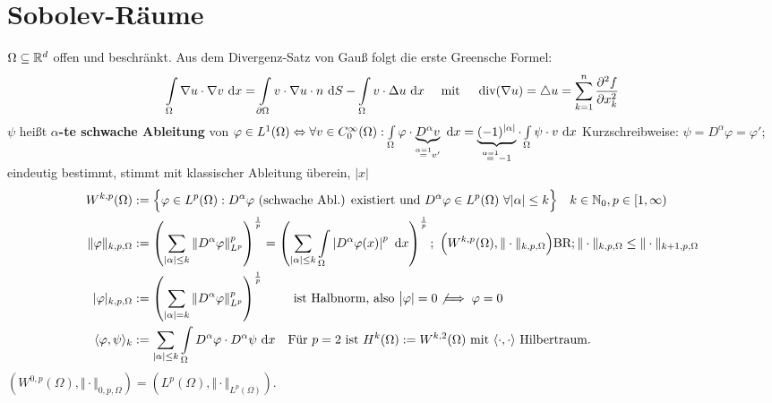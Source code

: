 \documentclass[12pt]{scrartcl}
\begin{document}
	\section{Sobolev-Räume}
	
	$\Omega\subseteq\mathbb{R}^d$ offen und beschränkt.
	Aus dem Divergenz-Satz von Gauß folgt die erste Greensche Formel:
	\begin{align}\label{eqGreen}
		\int\limits_\Omega\nabla u\cdot\nabla v\text{ d} x
		=\int\limits_{\partial\Omega}v\cdot\nabla u\cdot n\text{ d} S-\int\limits_\Omega v\cdot\Delta u\text{ d} x\quad\text{ mit }\quad
		\operatorname{div}(\nabla u)=\triangle u=\sum\limits_{k=1}^n\frac{\partial^2 f}{\partial x_k^2}
	\end{align}
	$\psi$ heißt \textbf{$\alpha$-te schwache Ableitung} von $\varphi\in L^1(\Omega)\Leftrightarrow
		\forall v\in C_0^\infty(\Omega):\int\limits_\Omega\varphi\cdot \underbrace{D^\alpha v}_{\overset{\alpha=1}=v'}\text{ d} x
		=\underbrace{(-1)^{|\alpha|}}_{\overset{\alpha=1}{=}-1}\cdot\int\limits_\Omega\psi\cdot v\text{ d} x$
	Kurzschreibweise: $\psi=D^\alpha\varphi=\varphi'$; eindeutig bestimmt, stimmt mit klassischer Ableitung überein, $|x|$
	\begin{align*}
		W^{k,p}(\Omega)
		&:=\Big\lbrace\varphi\in L^p(\Omega):D^\alpha\varphi\text{ (schwache Abl.) existiert und }D^\alpha\varphi\in L^p(\Omega)~\forall|\alpha|\leq k\Big\rbrace
		\quad k\in\mathbb{N}_0,p\in[1,\infty)\\
		\Vert\varphi\Vert_{k,p,\Omega}
		&:=\left(\sum\limits_{|\alpha|\leq k}\left\Vert D^\alpha\varphi\right\Vert^p_{L^p}\right)^{\frac{1}{p}}
		=\left(\sum\limits_{|\alpha|\leq k}\int\limits_\Omega\left| D^\alpha\varphi(x)\right|^p\text{ d} x\right)^{\frac{1}{p}};~\Big(W^{k,p}(\Omega),\Vert\cdot\Vert_{k,p,\Omega}\Big)\text{BR};\Vert\cdot\Vert_{k,p,\Omega}\leq\Vert\cdot\Vert_{k+1,p,\Omega}\\
		|\varphi|_{k,p,\Omega}
		&:=\left(\sum\limits_{|\alpha|= k}\left\Vert D^\alpha\varphi\right\Vert^p_{L^p}\right)^{\frac{1}{p}}\qquad\text{ ist Halbnorm, also }\big|\varphi|=0\not\implies\varphi=0\\
		\langle \varphi,\psi\rangle_k&:=\sum\limits_{|\alpha|\leq k}\int\limits_\Omega D^\alpha\varphi\cdot D^\alpha\psi\text{ d} x\quad\text{Für $p=2$ ist $H^k(\Omega):=W^{k,2}(\Omega)$ mit $\langle\cdot,\cdot\rangle$ Hilbertraum.}
	\end{align*}
	$(W^{0,p}(\Omega),\Vert\cdot\Vert_{0,p,\Omega})=(L^p(\Omega),\Vert\cdot\Vert_{L^p(\Omega)})$.\\
\end{document}
